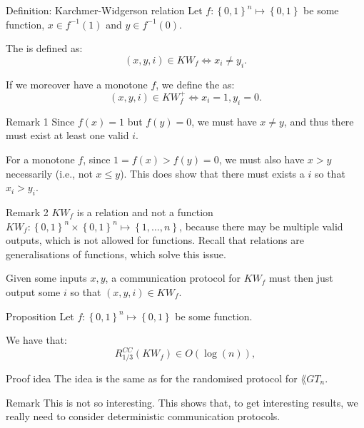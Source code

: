 \documentclass[a4paper]{article}
\begin{document}
\begin{parag}{Definition: Karchmer-Widgerson relation}
    Let $f: \left\{0, 1\right\}^n \mapsto \left\{0, 1\right\}$ be some function, $x \in f^{-1}\left(1\right)$ and $y \in f^{-1}\left(0\right)$.

    The  is defined as: 
    \[\left(x, y, i\right) \in KW_f \iff x_i \neq y_i.\]

    If we moreover have a monotone $f$, we define the  as: 
    \[\left(x, y, i\right) \in KW_f^+ \iff x_i = 1, y_i = 0.\]

    \begin{subparag}{Remark 1}
        Since $f\left(x\right) = 1$ but $f\left(y\right) = 0$, we must have $x \neq y$, and thus there must exist at least one valid $i$.

        For a monotone $f$, since $1 = f\left(x\right) > f\left(y\right) = 0$, we must also have $x > y$ necessarily (i.e., not $x \leq y$). This does show that there must exists a $i$ so that $x_i > y_i$.
    \end{subparag}

    \begin{subparag}{Remark 2}
        $KW_f$ is a relation and not a function $KW_f: \left\{0, 1\right\}^n \times \left\{0, 1\right\}^n \mapsto \left\{1, \ldots, n\right\}$, because there may be multiple valid outputs, which is not allowed for functions. Recall that relations are generalisations of functions, which solve this issue.

        Given some inputs $x, y$, a communication protocol for $KW_f$ must then just output some $i$ so that $\left(x, y, i\right) \in KW_f$. 
    \end{subparag}
\end{parag}

\begin{parag}{Proposition}
    Let $f: \left\{0, 1\right\}^n \mapsto \left\{0, 1\right\}$ be some function.

    We have that:
    \[R_{1 / 3}^{CC}\left(KW_f\right) \in O\left(\log\left(n\right)\right),\]

    \begin{subparag}{Proof idea}
        The idea is the same as for the randomised protocol for $\lang{GT}_n$. 
    \end{subparag}

    \begin{subparag}{Remark}
        This is not so interesting. This shows that, to get interesting results, we really need to consider deterministic communication protocols.
    \end{subparag}
\end{parag}
\end{document}
